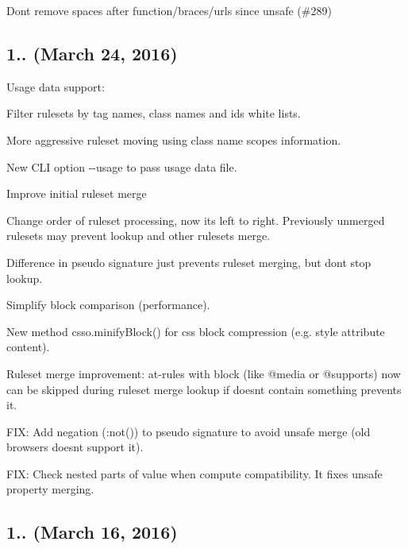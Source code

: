 \begin{DoxyItemize}
\item Don\textquotesingle{}t remove spaces after function/braces/urls since unsafe (\#289)
\end{DoxyItemize}

\subsection*{1.. (March 24, 2016)}


\begin{DoxyItemize}
\item Usage data support\+:
\begin{DoxyItemize}
\item Filter rulesets by tag names, class names and ids white lists.
\item More aggressive ruleset moving using class name scopes information.
\item New C\+LI option {\ttfamily -\/-\/usage} to pass usage data file.
\end{DoxyItemize}
\item Improve initial ruleset merge
\begin{DoxyItemize}
\item Change order of ruleset processing, now it\textquotesingle{}s left to right. Previously unmerged rulesets may prevent lookup and other rulesets merge.
\item Difference in pseudo signature just prevents ruleset merging, but don\textquotesingle{}t stop lookup.
\item Simplify block comparison (performance).
\end{DoxyItemize}
\item New method {\ttfamily csso.\+minify\+Block()} for css block compression (e.\+g. {\ttfamily style} attribute content).
\item Ruleset merge improvement\+: at-\/rules with block (like {\ttfamily @media} or {\ttfamily @supports}) now can be skipped during ruleset merge lookup if doesn\textquotesingle{}t contain something prevents it.
\item F\+IX\+: Add negation ({\ttfamily \+:not()}) to pseudo signature to avoid unsafe merge (old browsers doesn\textquotesingle{}t support it).
\item F\+IX\+: Check nested parts of value when compute compatibility. It fixes unsafe property merging.
\end{DoxyItemize}

\subsection*{1.. (March 16, 2016)}


